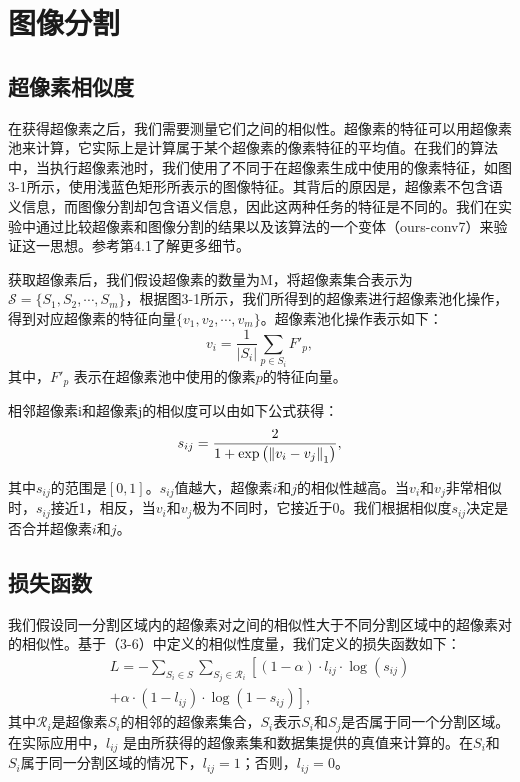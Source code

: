 
\chapter{图像分割}

\section{超像素相似度}
在获得超像素之后，我们需要测量它们之间的相似性。超像素的特征可以用超像素池来计算，它实际上是计算属于某个超像素的像素特征的平均值。在我们的算法中，当执行超像素池时，我们使用了不同于在超像素生成中使用的像素特征，如图3-1所示，使用浅蓝色矩形所表示的图像特征。其背后的原因是，超像素不包含语义信息，而图像分割却包含语义信息，因此这两种任务的特征是不同的。我们在实验中通过比较超像素和图像分割的结果以及该算法的一个变体（ours-conv7）来验证这一思想。参考第4.1了解更多细节。

获取超像素后，我们假设超像素的数量为M，将超像素集合表示为$\mathcal{S}=\{S_{1},S_{2},\cdots ,S_{m}\}$，根据图3-1所示，我们所得到的超像素进行超像素池化操作，得到对应超像素的特征向量$\{ v_{1},v_{2},\cdots,v_{m}\}$。超像素池化操作表示如下：
\begin{equation}
v_{i} = \frac{1}{|S_{i}|}\sum_{p\in S_{i} }F'_{p},
\end{equation}
其中，$F'_{p}$ 表示在超像素池中使用的像素$p$的特征向量。

相邻超像素i和超像素j的相似度可以由如下公式获得：
\begin{equation}\label{eqn:sim}
s_{ij} = \frac{2}{1+{\rm exp}\left ( \left \| v_{i}-v_{j}\right \|_{1}\right )},
\end{equation}

其中$s_{ij}$的范围是$[0,1]$。$s_{ij}$值越大，超像素$i$和$j$的相似性越高。当$v_{i}$和$v_{j}$非常相似时，$s_{ij}$接近1，相反，当$v_{i}$和$v_{j}$极为不同时，它接近于0。我们根据相似度$s_{ij}$决定是否合并超像素$i$和$j$。

\section{损失函数}

我们假设同一分割区域内的超像素对之间的相似性大于不同分割区域中的超像素对的相似性。基于（3-6）中定义的相似性度量，我们定义的损失函数如下：
\begin{equation}
\begin{split}
 L =  - \sum_{S_{i}\in S}\sum_{S_{j}\in \mathcal{R}_{i}}   \left[   { \left(
 1  -\alpha  \right)\cdot l_{ij}\cdot \log \left( s_{ij} \right)  } \right. \\
 \left. {  + \alpha \cdot \left( 1-l_{ij}\right) \cdot \log \left( 1- s_{ij}\right)  }   \right],
 \label{equation.6}
\end{split}
\end{equation}
其中$\mathcal{R}_{i}$是超像素$S_{i}$的相邻的超像素集合，$S_i$表示$S_i$和$S_j$是否属于同一个分割区域。在实际应用中，$l_{ij}$ 是由所获得的超像素集和数据集提供的真值来计算的。在$S_i$和$S_i$属于同一分割区域的情况下，$l_{ij} = 1$；否则，$l_{ij} = 0$。

